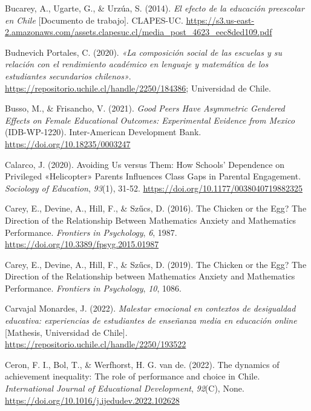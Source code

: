 \documentclass[
  spanish,
  a4paper,
  oneside]{scrbook}
\newlength{\cslhangindent}
\newenvironment{CSLReferences}[2] %
 {\begin{list}{}{%
  \setlength{\itemindent}{0pt}
  \setlength{\leftmargin}{0pt}
  \setlength{\parsep}{0pt}
  \ifodd #1
   \setlength{\leftmargin}{\cslhangindent}
   \setlength{\itemindent}{-1\cslhangindent}
  \fi
  \setlength{\itemsep}{#2\baselineskip}}}
 {\end{list}}
\begin{document}
\begin{CSLReferences}{1}{0}
Bucarey, A., Ugarte, G., \& Urzúa, S. (2014). \emph{El efecto de la
educación preescolar en Chile} {[}Documento de trabajo{]}. CLAPES-UC.
\url{https://s3.us-east-2.amazonaws.com/assets.clapesuc.cl/media_post_4623_eec8ded109.pdf}

Budnevich Portales, C. (2020). \emph{{«La composici{ó}n social de las
escuelas y su relaci{ó}n con el rendimiento acad{é}mico en lenguaje y
matem{á}tica de los estudiantes secundarios chilenos»}}.
\url{https://repositorio.uchile.cl/handle/2250/184386}; Universidad de
Chile.

Busso, M., \& Frisancho, V. (2021). \emph{Good Peers Have Asymmetric
Gendered Effects on Female Educational Outcomes: Experimental Evidence
from Mexico} (IDB-WP-1220). Inter-American Development Bank.
\url{https://doi.org/10.18235/0003247}

Calarco, J. (2020). Avoiding Us versus Them: How Schools' Dependence on
Privileged {«Helicopter»} Parents Influences Class Gaps in Parental
Engagement. \emph{Sociology of Education}, \emph{93}(1), 31-52.
\url{https://doi.org/10.1177/0038040719882325}

Carey, E., Devine, A., Hill, F., \& Szűcs, D. (2016). The Chicken or the
Egg? The Direction of the Relationship Between Mathematics Anxiety and
Mathematics Performance. \emph{Frontiers in Psychology}, \emph{6}, 1987.
\url{https://doi.org/10.3389/fpsyg.2015.01987}

Carey, E., Devine, A., Hill, F., \& Szűcs, D. (2019). The Chicken or the
Egg? The Direction of the Relationship between Mathematics Anxiety and
Mathematics Performance. \emph{Frontiers in Psychology}, \emph{10},
1086.

Carvajal Monardes, J. (2022). \emph{Malestar emocional en contextos de
desigualdad educativa: experiencias de estudiantes de ense{ñ}anza media
en educaci{ó}n online} {[}Mathesis, Universidad de Chile{]}.
\url{https://repositorio.uchile.cl/handle/2250/193522}

Ceron, F. I., Bol, T., \& Werfhorst, H. G. van de. (2022). The dynamics
of achievement inequality: The role of performance and choice in Chile.
\emph{International Journal of Educational Development}, \emph{92}(C),
None. \url{https://doi.org/10.1016/j.ijedudev.2022.102628}


\end{CSLReferences}
\end{document}
